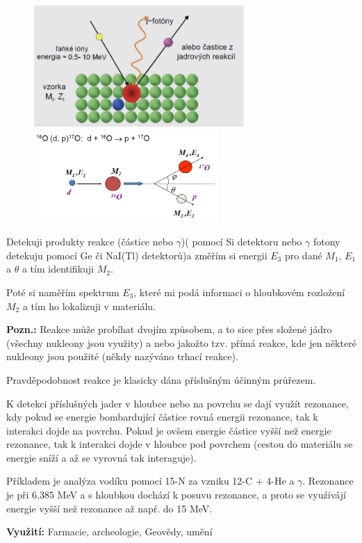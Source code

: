 \begin{figure}[H]
    \centering
	\includegraphics[width=8cm]{img/nra.png}
	\includegraphics[width=7cm]{img/nra2.png}
\end{figure}

Detekuji produkty reakce (částice nebo $\gamma$)( pomocí Si detektoru nebo $\gamma$ fotony detekuju pomocí Ge či NaI(Tl) detektorů)a změřím si energii $E_3$ pro dané $M_1$, $E_1$ a $\theta$ a tím identifikuji $M_2$.

Poté si naměřím spektrum $E_3$, které mi podá informaci o hloubkovém rozložení $M_2$ a tím ho lokalizuji v materiálu.


\textbf{Pozn.:} Reakce může probíhat dvojím způsobem, a to sice přes složené jádro (všechny nukleony jsou využity) a nebo jakožto tzv. přímá reakce, kde jen některé nukleony jsou použité (někdy nazýváno trhací reakce).

Pravděpodobnost reakce je klasicky dána příslušným účinným průřezem.

K detekci příslušných jader v hloubce nebo na povrchu se dají využít rezonance, kdy pokud se energie bombardující částice rovná energii rezonance, tak k interakci dojde na povrchu. Pokud je ovšem energie částice vyšší než energie rezonance, tak k interakci dojde v hloubce pod povrchem (cestou do materiálu se energie sníží a až se vyrovná tak interaguje).

Příkladem je analýza vodíku pomocí 15-N za vzniku 12-C + 4-He a $\gamma$. Rezonance je při 6,385 MeV a s hloubkou dochází k posuvu rezonance, a proto se vyuźívájí energie vyšší než rezonance až napŕ. do 15 MeV.

\textbf{Využití:} Farmacie, archeologie, Geovědy, umění

